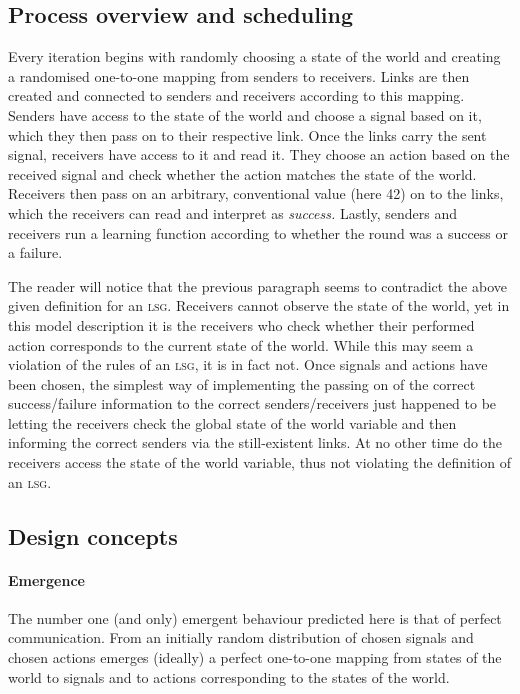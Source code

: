 \documentclass[DIV=calc,BCOR=0mm,pagesize]{scrartcl}
\newcommand{\lsg}{\textsc{lsg}}
\begin{document}
\subsection{Process overview and scheduling}
\label{ssec:modpro}
Every iteration begins with randomly choosing a state of the world and creating a randomised one-to-one mapping from senders to receivers.
Links are then created and connected to senders and receivers according to this mapping.
Senders have access to the state of the world and choose a signal based on it, which they then pass on to their respective link.
Once the links carry the sent signal, receivers have access to it and read it.
They choose an action based on the received signal and check whether the action matches the state of the world.
Receivers then pass on an arbitrary, conventional value (here 42) on to the links, which the receivers can read and interpret as \emph{success.}
Lastly, senders and receivers run a learning function according to whether the round was a success or a failure.

The reader will notice that the previous paragraph seems to contradict the above given definition for an \lsg.
Receivers cannot observe the state of the world, yet in this model description it is the receivers who check whether their performed action corresponds to the current state of the world.
While this may seem a violation of the rules of an \lsg, it is in fact not.
Once signals and actions have been chosen, the simplest way of implementing the passing on of the correct success/failure information to the correct senders/receivers just happened to be letting the receivers check the global state of the world variable and then informing the correct senders via the still-existent links.
At no other time do the receivers access the state of the world variable, thus not violating the definition of an \lsg.
 

\subsection{Design concepts}
\label{ssec:moddes}
\paragraph{Emergence}
The number one (and only) emergent behaviour predicted here is that of perfect communication.
From an initially random distribution of chosen signals and chosen actions emerges (ideally) a perfect one-to-one mapping from states of the world to signals and to actions corresponding to the states of the world.
\end{document}
